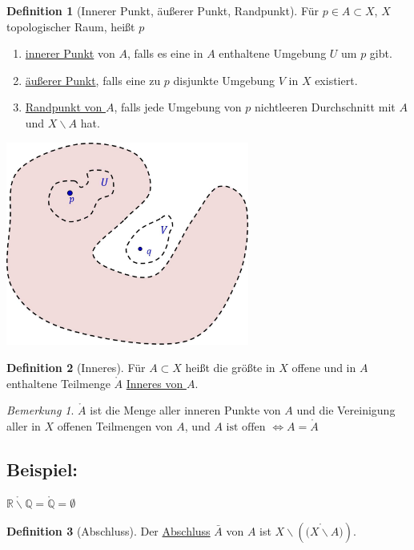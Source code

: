\documentclass[a4paper,11pt,notitlepage]{report}
\theoremstyle{remark}
\newtheorem{remark}{Bemerkung}[chapter]
\theoremstyle{definition}
\newtheorem{definition}{Definition}[chapter]
\newcommand{\R}{{\ensuremath{\mathbb{R}}}}
\newcommand{\Q}{{\ensuremath{\mathbb{Q}}}}
\newenvironment{bsp}[1]
{
\setlength{\fboxsep}{10pt}
\subsection*{Beispiel: #1}
\begin{upshape}
}
{
\end{upshape}
}
\begin{document}
\begin{definition}[Innerer Punkt, äußerer Punkt, Randpunkt]
	Für $p \in A \subset X$, $X$ topologischer Raum, heißt $p$
	\newline
	\begin{enumerate}[(1)]
		\item \underline{innerer Punkt} von $A$, falls es eine in $A$ enthaltene Umgebung $U$ um $p$ gibt. 
		\item \underline{äußerer Punkt}, falls eine zu $p$ disjunkte Umgebung $V$ in $X$ existiert.
		\item \underline{Randpunkt von $A$}, falls jede Umgebung von $p$ nichtleeren Durchschnitt mit $A$ und $X \backslash A$ hat.
	\end{enumerate}
\end{definition}
	\begin{center}
	\includegraphics[width=0.6\textwidth]{images/innen_aussen.jpg}
	\end{center}
	
\begin{definition}[Inneres]
	Für $A \subset X$ heißt die größte in $X$ offene und in $A$ enthaltene Teilmenge $\mathring A$ \underline{Inneres von $A$}.
\end{definition}

\begin{remark}
	$\mathring A$ ist die Menge aller inneren Punkte von $A$ und die Vereinigung aller in $X$ offenen Teilmengen von $A$, und $A \text{ ist offen } \Leftrightarrow A = \mathring A$
\end{remark}

\begin{bsp}{}
	$\mathring {\R \backslash \Q} = \mathring \Q = \emptyset$
\end{bsp}

\begin{definition}[Abschluss]
	Der \underline{Abschluss} $\bar{A}$ von $A$ ist $X \backslash \left ( \mathring {(X \backslash A} ) \right )$.
\end{definition}
\end{document}
